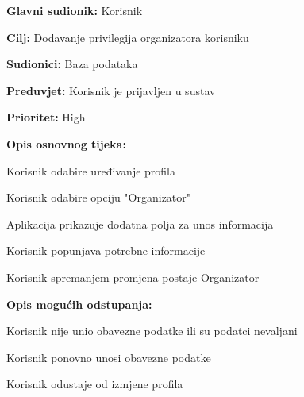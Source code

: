 \noindent {}
   	\begin{packed_item}
   		
   		\item \textbf{Glavni sudionik: }Korisnik
   		\item \textbf{Cilj:} Dodavanje privilegija organizatora korisniku
   		\item \textbf{Sudionici:} Baza podataka
   		\item \textbf{Preduvjet:} Korisnik je prijavljen u sustav
   		\item \textbf{Prioritet:} High
   		\item \textbf{Opis osnovnog tijeka:}
   		
   		\item[] \begin{packed_enum}
   			
   			\item Korisnik odabire uređivanje profila
   			\item Korisnik odabire opciju "Organizator"
   			\item Aplikacija prikazuje dodatna polja za unos informacija
   			\item Korisnik popunjava potrebne informacije
   			\item Korisnik spremanjem promjena postaje Organizator
   			
   		\end{packed_enum}
   		
   		\item  \textbf{Opis mogućih odstupanja:}
   		
   		\item[] \begin{packed_item}
   			
   			\item[5.a] Korisnik nije unio obavezne podatke ili su podatci nevaljani
   			\item[] \begin{packed_enum}
   				
   				\item Korisnik ponovno unosi obavezne podatke
   				\item Korisnik odustaje od izmjene profila
   				
   			\end{packed_enum}
   		\end{packed_item}
   	\end{packed_item}

